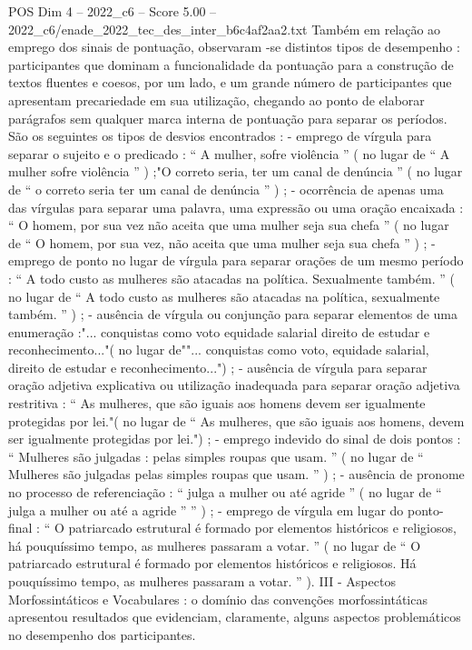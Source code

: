 \begin{textsample}{POS Dim 4 – 2022\_c6 – Score 5.00 – 2022\_c6/enade\_2022\_tec\_des\_inter\_b6c4af2aa2.txt}
Também em relação ao emprego dos sinais de pontuação, observaram -se distintos tipos de desempenho : participantes que dominam a funcionalidade da pontuação para a construção de textos fluentes e coesos, por um lado, e um grande número de participantes que apresentam precariedade em sua utilização, chegando ao ponto de elaborar parágrafos sem qualquer marca interna de pontuação para separar os períodos.
São os seguintes os tipos de desvios encontrados : - emprego de vírgula para separar o sujeito e o predicado : “ A mulher, sofre violência ” ( no lugar de “ A mulher sofre violência ” ) ;"O correto seria, ter um canal de denúncia ” ( no lugar de “ o correto seria ter um canal de denúncia ” ) ; - ocorrência de apenas uma das vírgulas para separar uma palavra, uma expressão ou uma oração encaixada : “ O homem, por sua vez não aceita que uma mulher seja sua chefa ” ( no lugar de “ O homem, por sua vez, não aceita que uma mulher seja sua chefa ” ) ; - emprego de ponto no lugar de vírgula para separar orações de um mesmo período : “ A todo custo as mulheres são atacadas na política.
Sexualmente também. ” ( no lugar de “ A todo custo as mulheres são atacadas na política, sexualmente também. ” ) ; - ausência de vírgula ou conjunção para separar elementos de uma enumeração :"... conquistas como voto equidade salarial direito de estudar e reconhecimento..."( no lugar de""... conquistas como voto, equidade salarial, direito de estudar e reconhecimento...") ; - ausência de vírgula para separar oração adjetiva explicativa ou utilização inadequada para separar oração adjetiva restritiva : “ As mulheres, que são iguais aos homens devem ser igualmente protegidas por lei."( no lugar de “ As mulheres, que são iguais aos homens, devem ser igualmente protegidas por lei.") ; - emprego indevido do sinal de dois pontos : “ Mulheres são julgadas : pelas simples roupas que usam. ” ( no lugar de “ Mulheres são julgadas pelas simples roupas que usam. ” ) ; - ausência de pronome no processo de referenciação : “ julga a mulher ou até agride ” ( no lugar de “ julga a mulher ou até a agride ” ” ) ; - emprego de vírgula em lugar do ponto-final : “ O patriarcado estrutural é formado por elementos históricos e religiosos, há pouquíssimo tempo, as mulheres passaram a votar. ” ( no lugar de “ O patriarcado estrutural é formado por elementos históricos e religiosos.
Há pouquíssimo tempo, as mulheres passaram a votar. ” ).
III - Aspectos Morfossintáticos e Vocabulares : o domínio das convenções morfossintáticas apresentou resultados que evidenciam, claramente, alguns aspectos problemáticos no desempenho dos participantes.

\end{textsample}
